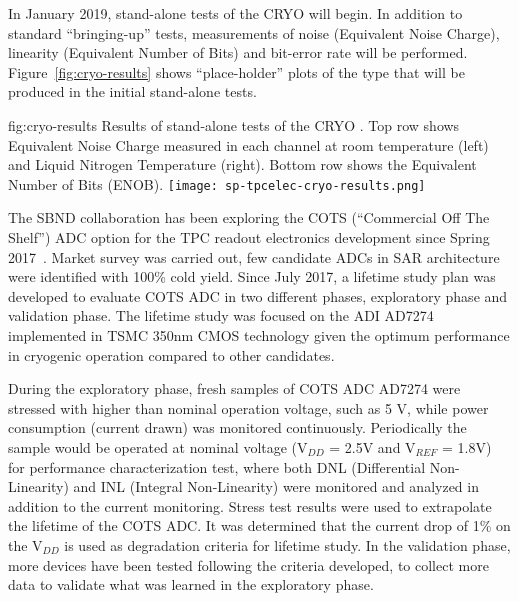 In January 2019, stand-alone tests of the CRYO  will begin. In addition to standard ``bringing-up'' tests, measurements of noise (Equivalent Noise Charge), linearity (Equivalent Number of Bits) and bit-error rate will be performed. Figure~\ref{fig:cryo-results} shows ``place-holder'' plots of the type that will be produced in the initial stand-alone tests.

\begin{dunefigure}
{fig:cryo-results}
{Results of stand-alone tests of the CRYO . Top row shows Equivalent Noise Charge measured in each channel at room temperature (left) and Liquid Nitrogen Temperature (right). Bottom row shows the Equivalent Number of Bits (ENOB). }
\texttt{[image: sp-tpcelec-cryo-results.png]}
\end{dunefigure}

\label{sec:fdsp-tpcelec-design-femb-alt-cots}

The SBND collaboration has been exploring the COTS (``Commercial Off The Shelf'') ADC option for the TPC readout electronics development since Spring 2017~\cite{Chen:2018zic}. Market survey was carried out, few candidate ADCs in SAR architecture were identified with 100\% cold yield. Since July 2017, a lifetime study plan was developed to evaluate COTS ADC in two different phases, exploratory phase and validation phase. The lifetime study was focused on the ADI AD7274 implemented in TSMC 350nm CMOS technology given the optimum performance in cryogenic operation compared to other candidates.

During the exploratory phase, fresh samples of COTS ADC AD7274 were stressed with higher than nominal operation voltage, such as 5 V, while power consumption (current drawn) was monitored continuously. Periodically the sample would be operated at nominal voltage (V$_{DD}$ = 2.5V and V$_{REF}$ = 1.8V) for performance characterization test, where both DNL (Differential Non-Linearity) and INL (Integral Non-Linearity) were monitored and analyzed in addition to the current monitoring. Stress test results were used to extrapolate the lifetime of the COTS ADC. It was determined that the current drop of 1\% on the V$_{DD}$ is used as degradation criteria for lifetime study. In the validation phase, more devices have been tested following the criteria developed, to collect more data to validate what was learned in the exploratory phase.

